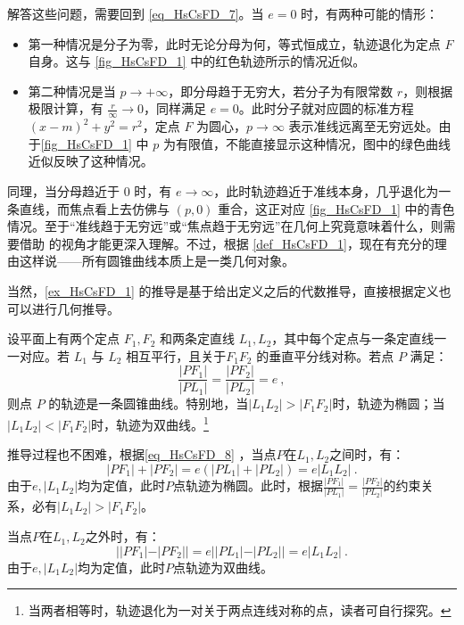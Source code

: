 解答这些问题，需要回到 \autoref{eq_HsCsFD_7}。当 $e = 0$ 时，有两种可能的情形：
\begin{itemize}
\item 第一种情况是分子为零，此时无论分母为何，等式恒成立，轨迹退化为定点 $F$ 自身。这与 \autoref{fig_HsCsFD_1} 中的红色轨迹所示的情况近似。
\item 第二种情况是当 $p \to +\infty$，即分母趋于无穷大，若分子为有限常数 $r$，则根据极限计算，有 $\displaystyle\frac{r}{\infty} \to 0$，同样满足 $e = 0$。此时分子就对应圆的标准方程 $(x - m)^2 + y^2 = r^2$，定点 $F$ 为圆心，$p \to \infty$ 表示准线远离至无穷远处。由于\autoref{fig_HsCsFD_1} 中 $p$ 为有限值，不能直接显示这种情况，图中的绿色曲线近似反映了这种情况。
\end{itemize}

同理，当分母趋近于 $0$ 时，有 $e \to \infty$，此时轨迹趋近于准线本身，几乎退化为一条直线，而焦点看上去仿佛与 $(p, 0)$ 重合，这正对应 \autoref{fig_HsCsFD_1} 中的青色情况。至于“准线趋于无穷远”或“焦点趋于无穷远”在几何上究竟意味着什么，则需要借助  的视角才能更深入理解。不过，根据 \autoref{def_HsCsFD_1}，现在有充分的理由这样说——所有圆锥曲线本质上是一类几何对象。


当然，\autoref{ex_HsCsFD_1} 的推导是基于给出定义之后的代数推导，直接根据定义也可以进行几何推导。

设平面上有两个定点 $F_1, F_2$ 和两条定直线 $L_1, L_2$，其中每个定点与一条定直线一一对应。若 $L_1$ 与 $L_2$ 相互平行，且关于$F_1F_2$ 的垂直平分线对称。若点 $P$ 满足：
\begin{equation}\label{eq_HsCsFD_8}
\frac{|PF_1|}{|PL_1|} = \frac{|PF_2|}{|PL_2|} = e~,
\end{equation}
则点 $P$ 的轨迹是一条圆锥曲线。特别地，当$|L_1L_2|>|F_1F_2|$时，轨迹为椭圆；当$|L_1L_2|<|F_1F_2|$时，轨迹为双曲线。\footnote{当两者相等时，轨迹退化为一对关于两点连线对称的点，读者可自行探究。}

推导过程也不困难，根据\autoref{eq_HsCsFD_8} ，当点$P$在$L_1,L_2$之间时，有：
\begin{equation}
|PF_1|+|PF_2|=e(|PL_1|+|PL_2|)=e|L_1L_2|~.
\end{equation}
由于$e,|L_1L_2|$均为定值，此时$P$点轨迹为椭圆。此时，根据$\displaystyle\frac{|PF_1|}{|PL_1|} = \frac{|PF_2|}{|PL_2|} $的约束关系，必有$|L_1L_2|>|F_1F_2|$。

当点$P$在$L_1,L_2$之外时，有：
\begin{equation}
||PF_1|-|PF_2||=e||PL_1|-|PL_2||=e|L_1L_2|~.
\end{equation}
由于$e,|L_1L_2|$均为定值，此时$P$点轨迹为双曲线。

